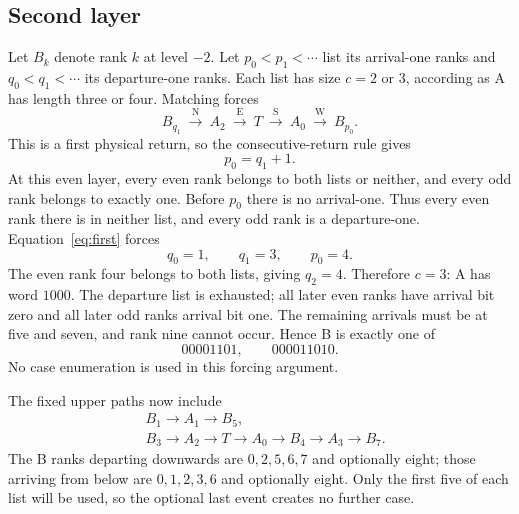 \documentclass[11pt]{article}
\begin{document}
\subsection{Second layer}
Let $B_k$ denote rank $k$ at level $-2$. Let $p_0<p_1<\cdots$ list its
arrival-one ranks and $q_0<q_1<\cdots$ its departure-one ranks. Each list has
size $c=2$ or $3$, according as A has length three or four. Matching forces
\[
 B_{q_1}\ \xrightarrow{\mathrm N}\ A_2
 \ \xrightarrow{\mathrm E}\ T
 \ \xrightarrow{\mathrm S}\ A_0
 \ \xrightarrow{\mathrm W}\ B_{p_0}.
\]
This is a first physical return, so the consecutive-return rule gives
\begin{equation}\label{eq:first}
 p_0=q_1+1.
\end{equation}
At this even layer, every even rank belongs to both lists or neither, and
every odd rank belongs to exactly one. Before $p_0$ there is no arrival-one.
Thus every even rank there is in neither list, and every odd rank is a
departure-one. Equation~\eqref{eq:first} forces
\[
 q_0=1,\qquad q_1=3,\qquad p_0=4.
\]
The even rank four belongs to both lists, giving $q_2=4$. Therefore $c=3$:
A has word $1000$. The departure list is exhausted; all later even ranks
have arrival bit zero and all later odd ranks arrival bit one. The remaining
arrivals must be at five and seven, and rank nine cannot occur. Hence B is
exactly one of
\begin{equation}\label{eq:B}
 00001101,\qquad000011010.
\end{equation}
No case enumeration is used in this forcing argument.

The fixed upper paths now include
\begin{align*}
 &B_1\to A_1\to B_5,\\
 &B_3\to A_2\to T\to A_0\to B_4\to A_3\to B_7.
\end{align*}
The B ranks departing downwards are $0,2,5,6,7$ and optionally eight; those
arriving from below are $0,1,2,3,6$ and optionally eight. Only the first five
of each list will be used, so the optional last event creates no further case.
\end{document}

